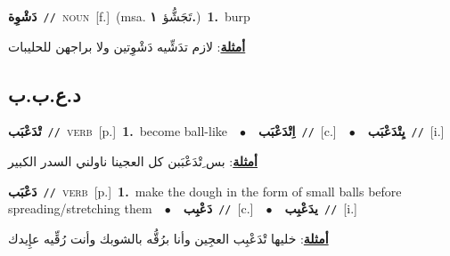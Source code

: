 \documentclass[10pt,a4paper,twoside]{article} %
\begin{document}
\begin{multicols}{2}
{\setlength\topsep{0pt}\textbf{\foreignlanguage{arabic}{دَشْوِة}}\ {\color{gray}\texttt{//}\color{black}}\ \textsc{noun}\ [f.]\ \color{gray}(msa. \foreignlanguage{arabic}{تَجَشُّؤ}~\foreignlanguage{arabic}{\textbf{١.}})\color{black}\ \textbf{1.}~burp\  \begin{flushright}\color{gray}\foreignlanguage{arabic}{\textbf{\underline{\foreignlanguage{arabic}{أمثلة}}}: لازم تدَشِّيه دَشْوِتين ولا براجهن للحليبات}\end{flushright}\color{black}} \vspace{2mm}

\vspace{-3mm}
\subsection*{\color{blue}\foreignlanguage{arabic}{د.ع.ب.ب}\color{blue}{}} 

{\setlength\topsep{0pt}\textbf{\foreignlanguage{arabic}{تْدَعْبَب}}\ {\color{gray}\texttt{//}\color{black}}\ \textsc{verb}\ [p.]\ \textbf{1.}~become ball-like\ \ $\bullet$\ \ \setlength\topsep{0pt}\textbf{\foreignlanguage{arabic}{اِتْدَعْبَب}}\ {\color{gray}\texttt{//}\color{black}}\ [c.]\ \ $\bullet$\ \ \setlength\topsep{0pt}\textbf{\foreignlanguage{arabic}{يِتْدَعْبَب}}\ {\color{gray}\texttt{//}\color{black}}\ [i.]\  \begin{flushright}\color{gray}\foreignlanguage{arabic}{\textbf{\underline{\foreignlanguage{arabic}{أمثلة}}}: بس ِتْدَعْبَبن كل العجينا ناولني السدر الكبير}\end{flushright}\color{black}} \vspace{2mm}

{\setlength\topsep{0pt}\textbf{\foreignlanguage{arabic}{دَعْبَب}}\ {\color{gray}\texttt{//}\color{black}}\ \textsc{verb}\ [p.]\ \textbf{1.}~make the dough in the form of small balls before spreading/stretching them\ \ $\bullet$\ \ \setlength\topsep{0pt}\textbf{\foreignlanguage{arabic}{دَعْبِب}}\ {\color{gray}\texttt{//}\color{black}}\ [c.]\ \ $\bullet$\ \ \setlength\topsep{0pt}\textbf{\foreignlanguage{arabic}{يدَعْبِب}}\ {\color{gray}\texttt{//}\color{black}}\ [i.]\  \begin{flushright}\color{gray}\foreignlanguage{arabic}{\textbf{\underline{\foreignlanguage{arabic}{أمثلة}}}: خليها تْدَعْبِب العجِين وأنا برُقُّه بالشوبك وأنت رُقِّيه عإِيدك}\end{flushright}\color{black}} \vspace{2mm}


\end{multicols}
\end{document}
